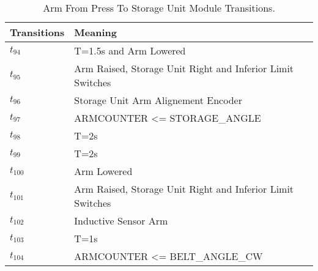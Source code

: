 \begin{table}[H]
\caption{Arm From Press To Storage Unit Module Transitions.}
\centering
\begin{tabular}{M{5cm}M{10cm}}
Transitions & Meaning\\
\hline
\hyperlink{partialNet:tt94}{\hypertarget{partialTable:tt94}{$t_{94}$}} & T=1.5s and Arm Lowered\\
\hyperlink{partialNet:t95}{\hypertarget{partialTable:t95}{$t_{95}$}} & Arm Raised, Storage Unit Right and Inferior Limit Switches\\
\hyperlink{partialNet:t96}{\hypertarget{partialTable:t96}{$t_{96}$}} & Storage Unit Arm Alignement Encoder\\
\hyperlink{partialNet:t97}{\hypertarget{partialTable:t97}{$t_{97}$}} & ARMCOUNTER <= STORAGE_ANGLE\\
\hyperlink{partialNet:tt98}{\hypertarget{partialTable:tt98}{$t_{98}$}} & T=2s\\
\hyperlink{partialNet:tt99}{\hypertarget{partialTable:tt99}{$t_{99}$}} & T=2s\\
\hyperlink{partialNet:t100}{\hypertarget{partialTable:t100}{$t_{100}$}} & Arm Lowered\\
\hyperlink{partialNet:t101}{\hypertarget{partialTable:t101}{$t_{101}$}} & Arm Raised, Storage Unit Right and Inferior Limit Switches\\
\hyperlink{partialNet:t102}{\hypertarget{partialTable:t102}{$t_{102}$}} & Inductive Sensor Arm\\
\hyperlink{partialNet:tt103}{\hypertarget{partialTable:tt103}{$t_{103}$}} & T=1s\\
\hyperlink{partialNet:t104}{\hypertarget{partialTable:t104}{$t_{104}$}} & ARMCOUNTER <= BELT_ANGLE_CW\\
\end{tabular}
\end{table}

